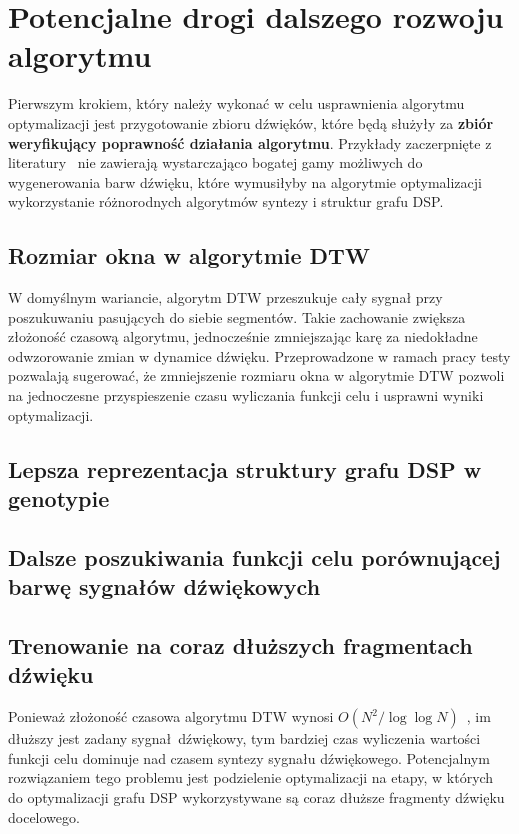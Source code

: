 
\section{Potencjalne drogi dalszego rozwoju algorytmu}

Pierwszym krokiem, który należy wykonać w celu usprawnienia
algorytmu optymalizacji jest przygotowanie zbioru dźwięków,
które będą służyły za \textbf{zbiór weryfikujący poprawność działania algorytmu}.
Przykłady zaczerpnięte z literatury~\cite{evolutionary_puredata_results}
nie zawierają wystarczająco bogatej gamy możliwych do wygenerowania
barw dźwięku, które wymusiłyby na algorytmie optymalizacji wykorzystanie
różnorodnych algorytmów syntezy i struktur grafu DSP\@.



\subsection{Rozmiar okna w algorytmie DTW}

W domyślnym wariancie, algorytm DTW przeszukuje cały sygnał
przy poszukuwaniu pasujących do siebie segmentów. Takie
zachowanie zwiększa złożoność czasową algorytmu, jednocześnie
zmniejszając karę za niedokładne odwzorowanie zmian w dynamice dźwięku.
Przeprowadzone w ramach pracy testy pozwalają sugerować, że zmniejszenie
rozmiaru okna w algorytmie DTW pozwoli na jednoczesne przyspieszenie czasu
wyliczania funkcji celu i usprawni wyniki optymalizacji.

\subsection{Lepsza reprezentacja struktury grafu DSP w genotypie}

\subsection{Dalsze poszukiwania funkcji celu porównującej barwę sygnałów dźwiękowych}


\subsection{Trenowanie na coraz dłuższych fragmentach dźwięku}

Ponieważ złożoność czasowa algorytmu DTW wynosi $O(N^2/\log\log N)$~\cite{dtw_time_complexity},
im dłuższy jest zadany sygnał dźwiękowy, tym bardziej czas wyliczenia
wartości funkcji celu dominuje nad czasem syntezy sygnału dźwiękowego. Potencjalnym
rozwiązaniem tego problemu jest podzielenie optymalizacji na etapy, w których
do optymalizacji grafu DSP wykorzystywane są coraz dłuższe fragmenty dźwięku docelowego.
